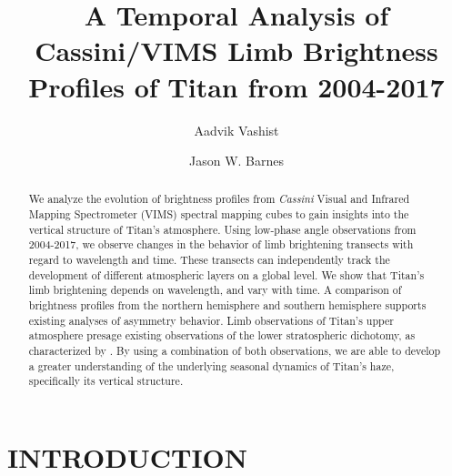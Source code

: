 \documentclass[tighten,linenumbers,twocolumn]{aastex631}
\begin{document}
\title{A Temporal Analysis of Cassini/VIMS Limb Brightness Profiles of Titan from 2004-2017
}
\author[0000-0002-6318-7226]{Aadvik Vashist}
\author[0000-0002-7755-3530]{Jason W. Barnes}



\begin{abstract}
We analyze the evolution of brightness profiles from \textit{Cassini} Visual and Infrared Mapping Spectrometer (VIMS) spectral mapping cubes to gain insights into the vertical structure of Titan’s atmosphere. Using low-phase angle observations from 2004-2017, we observe changes in the behavior of limb brightening transects with regard to wavelength and time. These transects can independently track the development of different atmospheric layers on a global level. We show that Titan’s limb brightening depends on wavelength, and vary with time. A comparison of brightness profiles from the northern hemisphere and southern hemisphere supports existing analyses of asymmetry behavior. Limb observations of Titan's upper atmosphere presage existing observations of the lower stratospheric dichotomy, as characterized by \cite{vashist2023titan}. By using a combination of both observations, we are able to develop a greater understanding of the underlying seasonal dynamics of Titan’s haze, specifically its vertical structure.

\end{abstract}



\section{INTRODUCTION}
\end{document}
